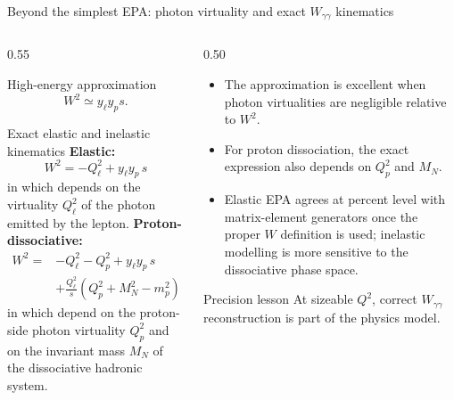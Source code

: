 \documentclass[aspectratio=1610,english]{beamer}
\begin{document}
\begin{frame}{Beyond the simplest EPA: photon virtuality and exact $W_{\gamma\gamma}$ kinematics}

\vspace{-0.2cm}

\begin{columns}%
	
\begin{column}{0.55\textwidth}
			
\begin{block}{High-energy approximation}
\small
\[
W^2\simeq y_\ell y_p s.
\]
\end{block}

\vspace{-0.3cm}

\begin{alertblock}{Exact elastic and inelastic kinematics}
\small
\textbf{\textcolor{LHGreen}{Elastic:}}
\[
W^2
=
-Q_\ell^2
+
y_\ell y_p\,s
\]
in which depends on the virtuality
$Q_\ell^2$ of the photon emitted by the lepton.
\textbf{\textcolor{LHRed}{Proton-dissociative:}}
\[
\begin{aligned}
W^2 ={}&
-Q_\ell^2 - Q_p^2 + y_\ell y_p\,s
\\[0.15em]
&+
\frac{Q_\ell^2}{s}
\left(Q_p^2 + M_N^2 - m_p^2\right)
\end{aligned}
\]
\footnotesize \justifying 
in which depend on the proton-side
photon virtuality $Q_p^2$ and on the invariant mass $M_N$ of the dissociative hadronic system.
	
\end{alertblock}

\end{column}

\begin{column}{0.50\textwidth}
\begin{itemize}
\scriptsize \justifying 
\item The approximation is excellent when photon virtualities are negligible relative to $W^2$.
\item For proton dissociation, the exact expression also depends on $Q_p^2$ and $M_N$.
\item Elastic EPA agrees at percent level with matrix-element generators once the 
proper $W$ definition is used; inelastic modelling is more sensitive to the dissociative phase space.
\end{itemize}

\begin{block}{Precision lesson}
\scriptsize
At sizeable $Q^2$, correct $W_{\gamma\gamma}$ reconstruction is part of the physics model.
\end{block}


\end{column}
\end{columns}
\end{frame}
\end{document}
